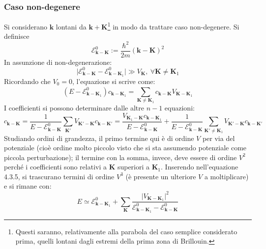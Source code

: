 \documentclass[10pt, a4paper]{scrartcl}
\numberwithin{equation}{subsection}
\theoremstyle{style1}
\theoremstyle{style2}
\begin{document}
\subsubsection{Caso non-degenere}
Si considerano $\mathbf{k} $ lontani da $\mathbf{k} + \mathbf{K} $\footnote{Questi saranno, relativamente alla parabola del caso semplice considerato prima, quelli lontani dagli estremi della prima zona di Brillouin.} in modo da trattare caso non-degenere. Si definisce 
\begin{equation}
	\mathscr{E}^0_{\mathbf{k} -\mathbf{K} } := \frac{\hbar ^2}{2m}(\mathbf{k} -\mathbf{K} )^2
\end{equation}
In assunzione di non-degenerazione:
\[
\lvert \mathscr{E}^0_{\mathbf{k} -\mathbf{K} } - \mathscr{E}^0_{\mathbf{k} -\mathbf{K} _1}  \rvert \gg V_\mathbf{K} , \ \forall \mathbf{K} \neq \mathbf{K} _1
\] 
Ricordando che $V_0=0$, l'equazione si scrive come:
\begin{equation}
	(E-\mathscr{E}^0_{\mathbf{k}-\mathbf{K} _1 }) c_{\mathbf{k} -\mathbf{K} _1} = \sum_{\mathbf{K} \neq\mathbf{K}_1 }^{} c_{\mathbf{k} -\mathbf{K} } V_{\mathbf{K} -\mathbf{K} _1} 
\end{equation}
I coefficienti si possono determinare dalle altre $n-1$ equazioni:
\begin{equation}
	c_{\mathbf{k} -\mathbf{K} } = \frac{1}{E - \mathscr{E}^0_{\mathbf{k} - \mathbf{K} } } \sum_{\mathbf{K} '}^{} V_{\mathbf{K}' - \mathbf{K} } c_{\mathbf{k} - \mathbf{K} '}=\frac{V_{\mathbf{K} _1 - \mathbf{K} } c_{\mathbf{k} -\mathbf{K} _1} }{E-\mathscr{E}^0_{\mathbf{k} -\mathbf{K} } } + \frac{1}{E-\mathscr{E}^0_{\mathbf{k} -\mathbf{K} } } \sum_{\mathbf{K} ' \neq \mathbf{K} _1}^{} V_{\mathbf{K} '-\mathbf{K} }c_{\mathbf{k} -\mathbf{K} '} 
	\end{equation}
Studiando ordini di grandezza, il primo termine qui \`e di ordine $V$ per via del potenziale (cio\`e ordine molto piccolo visto che si sta assumendo potenziale come piccola perturbazione); il termine con la somma, invece, deve essere di ordine $V^2$ perch\'e i coefficienti sono relativi a $\mathbf{K} $ superiori a $\mathbf{K} _1$. Inserendo nell'equazione 4.3.5, si trascurano termini di ordine $V^3$ (\`e presente un ulteriore $V$ a moltiplicare) e si rimane con:
\begin{equation}
	E \simeq \mathscr{E}^0_{\mathbf{k} -\mathbf{K} _1}  + \sum_{\mathbf{K} }^{} \frac{\lvert V_{\mathbf{K}-\mathbf{K} _1 }   \rvert ^2}{\mathscr{E}^0_{\mathbf{k} -\mathbf{K} _1 } - \mathscr{E}^0 _{\mathbf{k} -\mathbf{K} } }
\end{equation}
\end{document}
